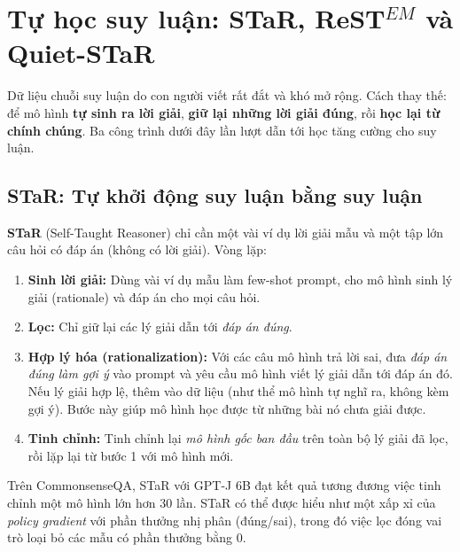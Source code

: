 
\section{Tự học suy luận: STaR, ReST\texorpdfstring{$^{EM}$}{-EM} và Quiet-STaR}
\label{sec:self_improvement}

Dữ liệu chuỗi suy luận do con người viết rất đắt và khó mở rộng. Cách thay thế: để mô hình \textbf{tự sinh ra lời giải}, \textbf{giữ lại những lời giải đúng}, rồi \textbf{học lại từ chính chúng}. Ba công trình dưới đây lần lượt dẫn tới học tăng cường cho suy luận.

\subsection{STaR: Tự khởi động suy luận bằng suy luận}
\label{ssec:star}
\textbf{STaR} (Self-Taught Reasoner) \cite{zelikman2022star} chỉ cần một vài ví dụ lời giải mẫu và một tập lớn câu hỏi có đáp án (không có lời giải). Vòng lặp:
\begin{enumerate}
	\item \textbf{Sinh lời giải:} Dùng vài ví dụ mẫu làm few-shot prompt, cho mô hình sinh lý giải (rationale) và đáp án cho mọi câu hỏi.
	\item \textbf{Lọc:} Chỉ giữ lại các lý giải dẫn tới \emph{đáp án đúng}.
	\item \textbf{Hợp lý hóa (rationalization):} Với các câu mô hình trả lời sai, đưa \emph{đáp án đúng làm gợi ý} vào prompt và yêu cầu mô hình viết lý giải dẫn tới đáp án đó. Nếu lý giải hợp lệ, thêm vào dữ liệu (như thể mô hình tự nghĩ ra, không kèm gợi ý). Bước này giúp mô hình học được từ những bài nó chưa giải được.
	\item \textbf{Tinh chỉnh:} Tinh chỉnh lại \emph{mô hình gốc ban đầu} trên toàn bộ lý giải đã lọc, rồi lặp lại từ bước 1 với mô hình mới.
\end{enumerate}
Trên CommonsenseQA, STaR với GPT-J 6B đạt kết quả tương đương việc tinh chỉnh một mô hình lớn hơn 30 lần. STaR có thể được hiểu như một xấp xỉ của \emph{policy gradient} với phần thưởng nhị phân (đúng/sai), trong đó việc lọc đóng vai trò loại bỏ các mẫu có phần thưởng bằng 0.

